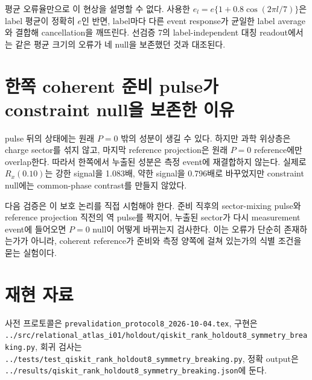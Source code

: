\documentclass[11pt]{article}
\begin{document}
평균 오류율만으로 이 현상을 설명할 수 없다. 사용한
$e_l=e\{1+0.8\cos(2\pi l/7)\}$은 label 평균이 정확히 $e$인 반면, label마다
다른 event response가 균일한 label average와 결합해 cancellation을 깨뜨린다.
선검증 7의 label-independent 대칭 readout에서는 같은 평균 크기의 오류가 네
null을 보존했던 것과 대조된다.

\section*{한쪽 coherent 준비 pulse가 constraint null을 보존한 이유}
pulse 뒤의 상태에는 원래 $P=0$ 밖의 성분이 생길 수 있다. 하지만 과학 위상층은
charge sector를 섞지 않고, 마지막 reference projection은 원래 $P=0$ reference에만
overlap한다. 따라서 한쪽에서 누출된 성분은 측정 event에 재결합하지 않는다.
실제로 $R_x(0.10)$는 강한 signal을 1.083배, 약한 signal을 0.796배로 바꾸었지만
constraint null에는 common-phase contrast를 만들지 않았다.

다음 검증은 이 보호 논리를 직접 시험해야 한다. 준비 직후의 sector-mixing pulse와
reference projection 직전의 역 pulse를 짝지어, 누출된 sector가 다시 measurement
event에 들어오면 $P=0$ null이 어떻게 바뀌는지 검사한다. 이는 오류가 단순히
존재하는가가 아니라, coherent reference가 준비와 측정 양쪽에 걸쳐 있는가의
식별 조건을 묻는 실험이다.

\section*{재현 자료}
사전 프로토콜은 \texttt{prevalidation\_protocol8\_2026-10-04.tex}, 구현은
\texttt{../src/relational\_atlas\_i01/holdout/qiskit\_rank\_holdout8\_symmetry\_breaking.py},
회귀 검사는 \texttt{../tests/test\_qiskit\_rank\_holdout8\_symmetry\_breaking.py},
정확 output은 \texttt{../results/qiskit\_rank\_holdout8\_symmetry\_breaking.json}에 둔다.
\end{document}
